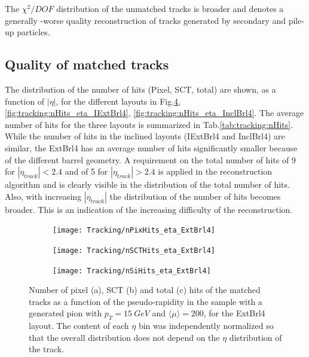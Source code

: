 \documentclass[a4paper,twoside,12pt]{book}
\begin{document}
The $\chi^2/DOF$ distribution of the unmatched tracks is broader and denotes a generally -worse quality reconstruction of tracks generated by secondary and pile-up particles. \\

\subsection{Quality of matched tracks}\label{sec:tracking:matchedQuality}
The distribution of the number of hits (Pixel, SCT, total) are shown, as a function of $|\eta|$, 
for the different layouts in Fig.\ref{fig:tracking:nHits_eta_ExtBrl4},
 \ref{fig:tracking:nHits_eta_IExtBrl4}, \ref{fig:tracking:nHits_eta_InclBrl4}.
The average number of hits for the three layouts is summarized in Tab.\ref{tab:tracking:nHits}. While
 the number of hits in the inclined layouts (IExtBrl4 and InclBrl4) are similar, the ExtBrl4
 has an average number of hits significantly smaller because of the different barrel geometry. A requirement on the total number of hits of 9 for $|\eta_{track}| < 2.4$ and of 5 for $|\eta_{track}| > 2.4$ is applied in the reconstruction algorithm
 and is clearly visible in the distribution of the total number of hits. Also, with increasing $|\eta_{track}|$ the distribution of the number of hits becomes broader. This is an indication of the increasing
 difficulty of the reconstruction.  \\

\begin{figure}
\begin{subfigure}{\linewidth}
\centering
\texttt{[image: Tracking/nPixHits\_eta\_ExtBrl4]}
\caption{}
\label{fig:tracking:nPixHits_eta_ExtBrl4}
\end{subfigure}

\begin{subfigure}{\linewidth}
\centering
\texttt{[image: Tracking/nSCTHits\_eta\_ExtBrl4]}
\caption{}
\label{fig:tracking:nSCTHits_eta_ExtBrl4}
\end{subfigure}

\begin{subfigure}{\linewidth}
\centering
\texttt{[image: Tracking/nSiHits\_eta\_ExtBrl4]}
\caption{}
\label{fig:tracking:nSiHits_eta_ExtBrl4}
\end{subfigure}
\caption{Number of pixel (a), SCT (b) and total (c) hits of the matched tracks as a function of the pseudo-rapidity in the sample with a generated pion with $p_{T} = 15\ GeV$ and $\langle\mu\rangle = 200$, for the ExtBrl4 layout. The content of each $\eta$ bin was independently normalized so that the overall distribution does not depend on the $\eta$ distribution of the track.}
\label{fig:tracking:nHits_eta_ExtBrl4}
\end{figure}
\end{document}
